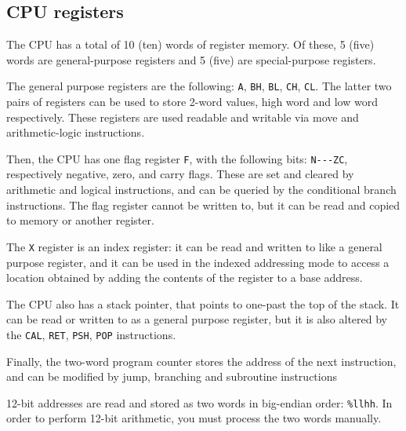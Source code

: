 \documentclass[a5paper,onecolumn,final,10pt]{memoir}
\let\ttt\texttt
\begin{document}
\subsection*{CPU registers}

The CPU has a total of 10 (ten) words of register memory. 
Of these, 5 (five) words are general-purpose registers 
and 5 (five) are special-purpose registers. 

The general purpose registers are the following: \ttt{A}, \ttt{BH}, \ttt{BL}, \ttt{CH}, \ttt{CL}. 
The latter two pairs of registers can be used to store 2-word values, high word and low word respectively. 
These registers are used readable and writable via move and arithmetic-logic instructions. 

Then, the CPU has one flag register \ttt{F}, with the following bits: \verb|N---ZC|, respectively negative, zero, and carry flags. 
These are set and cleared by arithmetic and logical instructions, 
and can be queried by the conditional branch instructions. 
The flag register cannot be written to, but it can be read and copied to memory or another register. 

The \ttt{X} register is an index register: it can be read and written to like a general purpose register, 
and it can be used in the indexed addressing mode to access a location obtained by adding the contents of the register to a base address. 

The CPU also has a stack pointer, that points to one-past the top of the stack. 
It can be read or written to as a general purpose register, but it is also altered by the \ttt{CAL}, \ttt{RET}, \ttt{PSH}, \ttt{POP} instructions. 

Finally, the two-word program counter stores the address of the next instruction, and can be modified by jump, branching and subroutine instructions

12-bit addresses are read and stored as two words in big-endian order: \ttt{\%llhh}.
In order to perform 12-bit arithmetic, you must process the two words manually.\footnotemark
\end{document}
